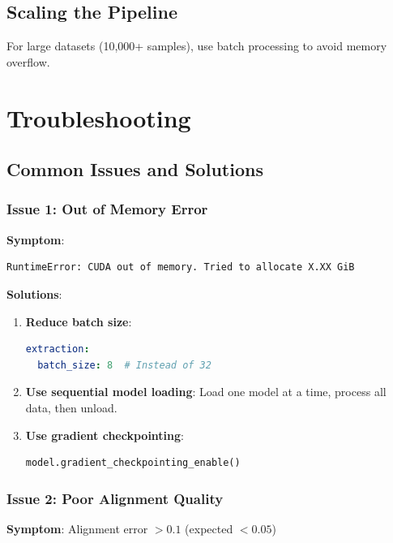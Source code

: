 \documentclass[12pt,a4paper,oneside]{report}
\begin{document}
\section{Scaling the Pipeline}

For large datasets (10,000+ samples), use batch processing to avoid memory overflow.

\clearpage
\chapter{Troubleshooting}

\section{Common Issues and Solutions}

\subsection{Issue 1: Out of Memory Error}

\textbf{Symptom}:
\begin{lstlisting}
RuntimeError: CUDA out of memory. Tried to allocate X.XX GiB
\end{lstlisting}

\textbf{Solutions}:

\begin{enumerate}
    \item \textbf{Reduce batch size}:
    \begin{lstlisting}[language=YAML]
extraction:
  batch_size: 8  # Instead of 32
    \end{lstlisting}

    \item \textbf{Use sequential model loading}:
    Load one model at a time, process all data, then unload.

    \item \textbf{Use gradient checkpointing}:
    \begin{lstlisting}[language=Python]
model.gradient_checkpointing_enable()
    \end{lstlisting}
\end{enumerate}

\subsection{Issue 2: Poor Alignment Quality}

\textbf{Symptom}: Alignment error $> 0.1$ (expected $< 0.05$)
\end{document}
